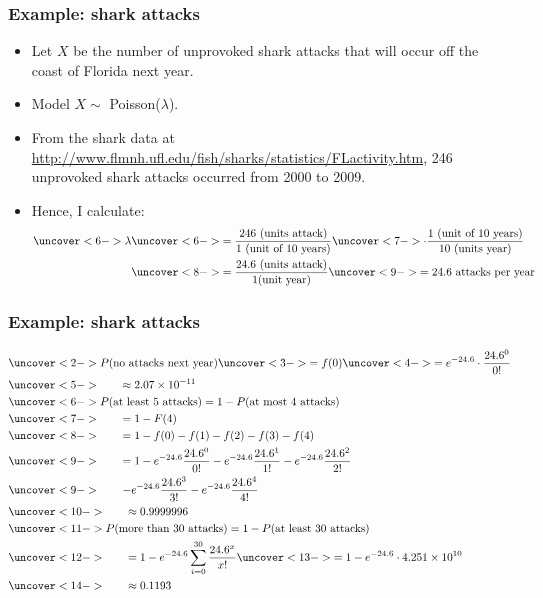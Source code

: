 \documentclass[handout]{beamer}\usepackage[]{graphicx}\usepackage[]{color}
\numberwithin{equation}{section}
\begin{document}
\begin{frame}
\frametitle{Example: shark attacks}
\begin{itemize}
\pause \item Let $X$ be the number of unprovoked shark attacks that will occur off the coast of Florida next year.
\pause \item Model $X \sim $ Poisson($\lambda$).
\pause \item From the shark data at \url{http://www.flmnh.ufl.edu/fish/sharks/statistics/FLactivity.htm}, 246 unprovoked shark attacks occurred from 2000 to 2009.
\pause \item Hence, I calculate:
\begin{align*}
\uncover<6->{\lambda} &\uncover<6->{= \frac{246 \text{ (units attack)}}{1 \text{ (unit of 10 years)}}} \uncover<7->{\cdot \frac{1 \text{ (unit of 10 years)}}{10 \text{ (units year)}}} \\
&\uncover<8->{=\frac{24.6 \text{ (units attack)}}{1 \text{(unit year)}}} \uncover<9->{= 24.6 \text{ attacks per year} }
\end{align*}
\end{itemize}
\end{frame}

\begin{frame}
\frametitle{Example: shark attacks} \small

\begin{align*}
&\uncover<2->{P(\text{no attacks next year}) \uncover<3->{=f(0)} \uncover<4->{= e^{-24.6} \cdot \frac{24.6^0}{0!}}} \\
&\uncover<5->{ \qquad \approx 2.07 \times 10^{-11}} \\
&\uncover<6->{P(\text{at least 5 attacks}) = 1 - P(\text{at most 4 attacks})} \\
&\uncover<7->{ \qquad =1 - F(4)} \\
&\uncover<8->{ \qquad =1 - f(0) - f(1) - f(2) - f(3) - f(4)} \\
&\uncover<9->{ \qquad =1 - e^{-24.6} \frac{24.6^0}{0!} - e^{-24.6} \frac{24.6^1}{1!} - e^{-24.6} \frac{24.6^2}{2!}} \\
&\uncover<9->{ \qquad - e^{-24.6} \frac{24.6^3}{3!} - e^{-24.6} \frac{24.6^4}{4!}} \\
&\uncover<10->{\qquad \approx 0.9999996} \\
&\uncover<11->{P(\text{more than 30 attacks}) = 1 - P(\text{at least 30 attacks})} \\
&\uncover<12->{ \qquad= 1 - e^{-24.6} \sum_{i = 0}^{30} \frac{24.6^x}{x!}}  \uncover<13->{= 1 - e^{-24.6} \cdot 4.251 \times 10^{10}} \\
&\uncover<14->{ \qquad \approx 0.1193}
\end{align*}
\end{frame}
\end{document}
